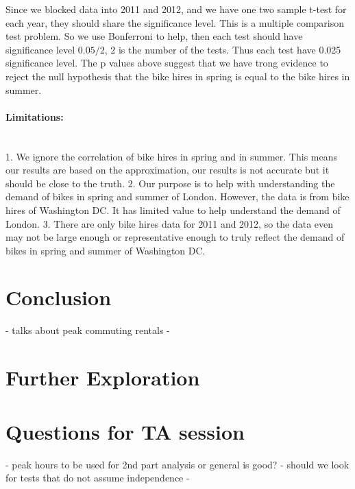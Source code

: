 Since we blocked data into 2011 and 2012, and we have one two sample t-test for each year, they should share the significance level. This is a multiple comparison test problem. So we use Bonferroni to help, then each test should have significance level $0.05/2$, 2 is the number of the tests. Thus each test have 0.025 significance level. The p values above suggest that we have trong evidence to reject the null hypothesis that the bike hires in spring is equal to the bike hires in summer. 

\paragraph{Limitations:} ~\\
1. We ignore the correlation of bike hires in spring and in summer. This means our results are based on the approximation, our results is not accurate but it should be close to the truth.
2. Our purpose is to help with understanding the demand of bikes in spring and summer of London. However, the data is from bike hires of Washington DC. It has limited value to help understand the demand of London.
3. There are only bike hires data for 2011 and 2012, so the data even may not be large enough or representative enough to truly reflect the demand of bikes in spring and summer of Washington DC.


\section{Conclusion}
- talks about peak commuting rentals
- 

\section{Further Exploration}


\section{Questions for TA session}
- peak hours to be used for 2nd part analysis or general is good?
- should we look for tests that do not assume independence
- 


